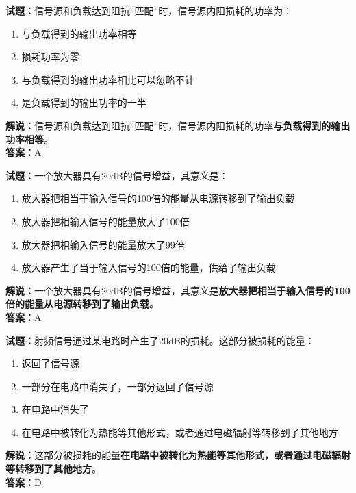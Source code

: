 \documentclass{ctexbook}
\begin{document}
\bigskip


\noindent\textbf{试题：}信号源和负载达到阻抗“匹配”时，信号源内阻损耗的功率为：
\begin{enumerate}[leftmargin=3em]
\item 与负载得到的输出功率相等
\item 损耗功率为零
\item 与负载得到的输出功率相比可以忽略不计
\item 是负载得到的输出功率的一半
\end{enumerate}
\noindent\textbf{解说：}信号源和负载达到阻抗“匹配”时，信号源内阻损耗的功率\textbf{与负载得到的输出功率相等}。\\\noindent\textbf{答案：}A



\bigskip


\noindent\textbf{试题：}一个放大器具有20dB的信号增益，其意义是：
\begin{enumerate}[leftmargin=3em]
\item 放大器把相当于输入信号的100倍的能量从电源转移到了输出负载
\item 放大器把相输入信号的能量放大了100倍
\item 放大器把相输入信号的能量放大了99倍
\item 放大器产生了当于输入信号的100倍的能量，供给了输出负载
\end{enumerate}
\noindent\textbf{解说：}一个放大器具有20dB的信号增益，其意义是\textbf{放大器把相当于输入信号的100倍的能量从电源转移到了输出负载}。\\\noindent\textbf{答案：}A



\bigskip


\noindent\textbf{试题：}射频信号通过某电路时产生了20dB的损耗。这部分被损耗的能量：
\begin{enumerate}[leftmargin=3em]
\item 返回了信号源
\item 一部分在电路中消失了，一部分返回了信号源
\item 在电路中消失了
\item 在电路中被转化为热能等其他形式，或者通过电磁辐射等转移到了其他地方
\end{enumerate}
\noindent\textbf{解说：}这部分被损耗的能量\textbf{在电路中被转化为热能等其他形式，或者通过电磁辐射等转移到了其他地方}。\\\noindent\textbf{答案：}D



\bigskip
\end{document}

